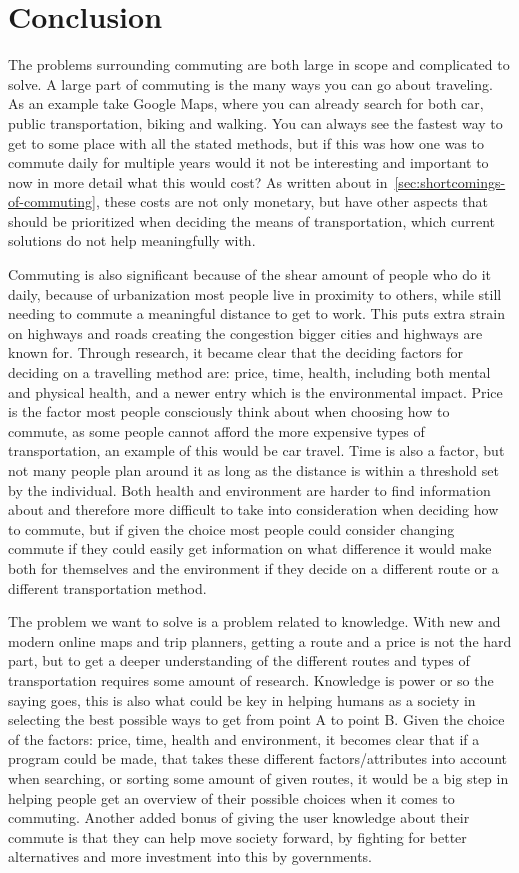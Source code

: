 \chapter{Conclusion}\label{ch:conclusion}
The problems surrounding commuting are both large in scope and complicated to solve.
A large part of commuting is the many ways you can go about traveling.
As an example take Google Maps, where you can already search for both car, public transportation, biking and walking.
You can always see the fastest way to get to some place with all the stated methods, but if this was how one was to
commute daily for multiple years would it not be interesting and important to now in more detail what this would cost?
As written about in~\ref{sec:shortcomings-of-commuting}, these costs are not only monetary, but have other
aspects that should be prioritized when deciding the means of transportation, which current solutions do not help
meaningfully with.

Commuting is also significant because of the shear amount of people who do it daily, because of urbanization most people
live in proximity to others, while still needing to commute a meaningful distance to get to work.
This puts extra strain on highways and roads creating the congestion bigger cities and highways are known for.
Through research, it became clear that the deciding factors for deciding on a travelling method are: price, time,
health, including both mental and physical health, and a newer entry which is the environmental impact.
Price is the factor most people consciously think about when choosing how to commute, as some people cannot afford the
more expensive types of transportation, an example of this would be car travel.
Time is also a factor, but not many people plan around it as long as the distance is within a threshold set by the
individual.
Both health and environment are harder to find information about and therefore more difficult to take into consideration
when deciding how to commute, but if given the choice most people could consider changing commute if they could easily
get information on what difference it would make both for themselves and the environment if they decide on a different
route or a different transportation method.

The problem we want to solve is a problem related to knowledge.
With new and modern online maps and trip planners, getting a route and a price is not the hard part, but to get a deeper
understanding of the different routes and types of transportation requires some amount of research.
Knowledge is power or so the saying goes, this is also what could be key in helping humans as a society in selecting
the best possible ways to get from point A to point B\@.
Given the choice of the factors: price, time, health and environment, it becomes clear that if a program could be made,
that takes these different factors/attributes into account when searching, or sorting some amount of given routes, it
would be a big step in helping people get an overview of their possible choices when it comes to commuting.
Another added bonus of giving the user knowledge about their commute is that they can help move society forward, by
fighting for better alternatives and more investment into this by governments.
